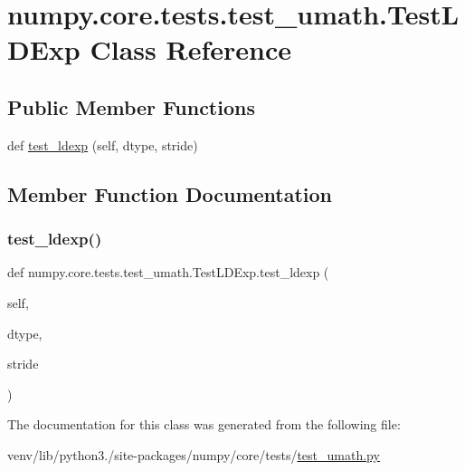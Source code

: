 \hypertarget{classnumpy_1_1core_1_1tests_1_1test__umath_1_1TestLDExp}{}\section{numpy.\+core.\+tests.\+test\+\_\+umath.\+Test\+L\+D\+Exp Class Reference}
\label{classnumpy_1_1core_1_1tests_1_1test__umath_1_1TestLDExp}
\subsection*{Public Member Functions}
\begin{DoxyCompactItemize}
\item 
def \hyperlink{classnumpy_1_1core_1_1tests_1_1test__umath_1_1TestLDExp_aa34f1d0dbbe53ae76e19ea77bedd8389}{test\+\_\+ldexp} (self, dtype, stride)
\end{DoxyCompactItemize}


\subsection{Member Function Documentation}
\mbox{\label{classnumpy_1_1core_1_1tests_1_1test__umath_1_1TestLDExp_aa34f1d0dbbe53ae76e19ea77bedd8389}} 
\subsubsection{\texorpdfstring{test\+\_\+ldexp()}{test\_ldexp()}}
{\footnotesize\ttfamily def numpy.\+core.\+tests.\+test\+\_\+umath.\+Test\+L\+D\+Exp.\+test\+\_\+ldexp (\begin{DoxyParamCaption}\item[{}]{self,  }\item[{}]{dtype,  }\item[{}]{stride }\end{DoxyParamCaption})}



The documentation for this class was generated from the following file\+:\begin{DoxyCompactItemize}
\item 
venv/lib/python3./site-\/packages/numpy/core/tests/\hyperlink{test__umath_8py}{test\+\_\+umath.\+py}\end{DoxyCompactItemize}
